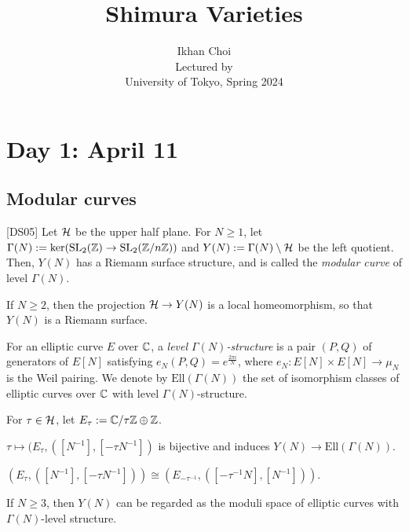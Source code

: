 \documentclass{../../../small}
\newcommand{\Ell}{\mathrm{Ell}}
\begin{document}
\title{Shimura Varieties}
\author{Ikhan Choi\\Lectured by \\University of Tokyo, Spring 2024}
\maketitle

\newpage
\section{Day 1: April 11}
\subsection{Modular curves}
[DS05]
Let $\mathcal{H}$ be the upper half plane.
For $N\ge1$, let $\Gamma(N):=\ker(\mathrm{SL}_2(\mathbb{Z})\to\mathrm{SL}_2(\mathbb{Z}/n\mathbb{Z}))$ and $Y(N):=\Gamma(N)\setminus\mathcal{H}$ be the left quotient.
Then, $Y(N)$ has a Riemann surface structure, and is called the \emph{modular curve} of level $\Gamma(N)$.

\begin{rmk*}
If $N\ge2$, then the projection $\mathcal{H}\to Y(N)$ is a local homeomorphism, so that $Y(N)$ is a Riemann surface.
\end{rmk*}

\begin{defn*}
For an elliptic curve $E$ over $\mathbb{C}$, a \emph{level $\Gamma(N)$-structure} is a pair $(P,Q)$ of generators of $E[N]$ satisfying $e_N(P,Q)=e^{\frac{2\pi i}N}$, where $e_N:E[N]\times E[N]\to\mu_N$ is the Weil pairing.
We denote by $\Ell(\Gamma(N))$ the set of isomorphism classes of elliptic curves over $\mathbb{C}$ with level $\Gamma(N)$-structure.
\end{defn*}

For $\tau\in\mathcal{H}$, let $E_\tau:=\mathbb{C}/{\tau\mathbb{Z}\oplus\mathbb{Z}}$.

\begin{prop*}
$\tau\mapsto(E_\tau,([N^{-1}],[-\tau N^{-1}])$ is bijective and induces $Y(N)\to\Ell(\Gamma(N))$.
\end{prop*}
\begin{rmk*}
$(E_\tau,([N^{-1}],[-\tau N^{-1}]))\cong(E_{-\tau^{-1}},([-\tau^{-1}N],[N^{-1}]))$.	
\end{rmk*}

\begin{rmk*}
If $N\ge3$, then $Y(N)$ can be regarded as the moduli space of elliptic curves with $\Gamma(N)$-level structure.
\end{rmk*}
\end{document}
